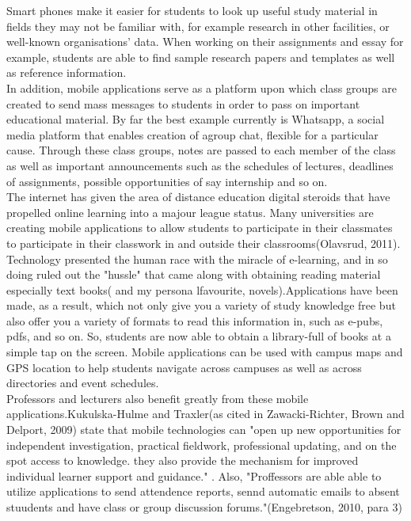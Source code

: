 \documentclass[10pt,letterpaper]{article}
\begin{document}
Smart phones make it easier for students to look up useful study material in fields they may not be familiar with, for example research in other facilities, or well-known organisations' data. When working on their assignments and essay for example, students are able to find sample research papers and templates as well as reference information.\\
In addition, mobile applications serve as a platform upon which class groups are created to send mass messages to students in order to pass on important educational material. By far the best example currently is Whatsapp, a social media platform that enables creation of agroup chat, flexible for a particular cause. Through these class groups, notes are passed to each member of the class as well as important announcements such as the schedules of lectures, deadlines of assignments, possible opportunities of say internship and so on.\\
The internet has  given the area of distance education digital steroids that have propelled online learning into a majour league status. Many universities are creating mobile applications to allow students to participate in their classmates to participate in their classwork in and outside their classrooms(Olavsrud, 2011).\\
Technology presented the human race with the miracle of  e-learning, and in so doing ruled out the "hussle" that came along with obtaining reading material especially text books( and my persona lfavourite, novels).Applications have been made, as a result, which not only  give you a variety of study knowledge free but also offer you a variety of formats to read this information in, such as e-pubs, pdfs, and so on. So, students are now able to obtain a library-full of books at a simple tap on the screen.
Mobile applications can be used with campus maps and GPS location to help students navigate across campuses as well as across directories and event schedules.\\
Professors and lecturers also benefit greatly from these mobile applications.Kukulska-Hulme and Traxler(as cited in Zawacki-Richter, Brown and Delport, 2009) state that mobile technologies can "open up new opportunities for independent investigation, practical fieldwork, professional updating, and on the spot access to knowledge. they also provide the mechanism for improved individual learner support and guidance." . Also, "Proffessors are able  able to utilize applications to send attendence reports, sennd automatic emails to absent stuudents and have class or group discussion forums."(Engebretson, 2010, para 3)\\
\end{document}
